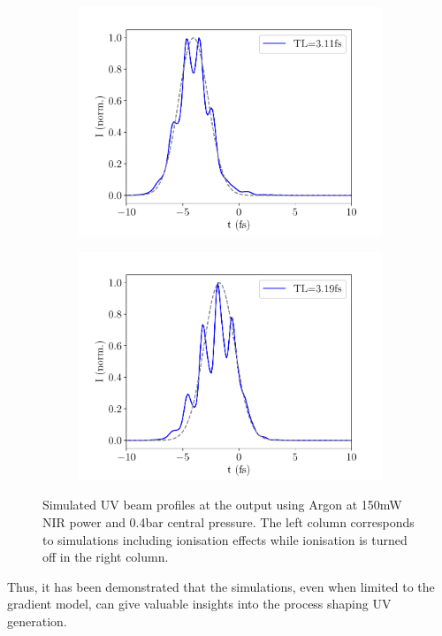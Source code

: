 \documentclass[a4paper]{jpconf}
\begin{document}
\begin{figure}[h]
\begin{subfigure}{0.49\textwidth}
        \includegraphics[width=\textwidth]{im/temporal_Ar_ion}
    \caption{}
    \end{subfigure}
    \begin{subfigure}{0.49\textwidth}
        \includegraphics[width=\textwidth]{im/temporal_Ar_no_ion}
    \caption{}
    \end{subfigure}  
\caption{Simulated UV beam profiles at the output using Argon at 150mW NIR power and 0.4bar central pressure. The left column corresponds to simulations including ionisation effects while ionisation is turned off in the right column. }\label{im:profile_Ar}
\end{figure}
Thus, it has been demonstrated that the simulations, even when limited to the gradient model, can give valuable insights into the process shaping UV generation. 
\end{document}
